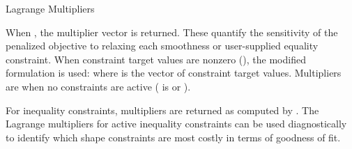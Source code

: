 \begin{Section}{Lagrange Multipliers}


When , the multiplier vector
is returned. These quantify the sensitivity of the penalized objective to
relaxing each smoothness or user-supplied equality constraint. When
constraint target values are nonzero
(), the modified
formulation is used:
where  is the vector of
constraint target values. Multipliers are  when no constraints
are active ( is  or ).

For inequality constraints, multipliers are returned as computed by
. The Lagrange multipliers for active
inequality constraints can be used diagnostically to identify which shape
constraints are most costly in terms of goodness of fit.
\end{Section}
%
